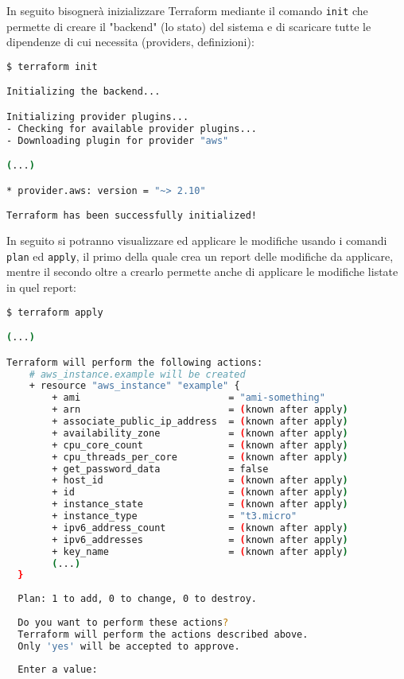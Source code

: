 \documentclass[../main.tex]{subfiles}
\begin{document}
    	        In seguito bisognerà inizializzare Terraform mediante il comando \verb|init| che permette di creare il "backend" (lo stato) del sistema e di scaricare tutte le dipendenze di cui necessita (providers, definizioni):
    	        \begin{lstlisting}[language=bash]
$ terraform init

Initializing the backend...

Initializing provider plugins...
- Checking for available provider plugins...
- Downloading plugin for provider "aws"

(...)

* provider.aws: version = "~> 2.10"

Terraform has been successfully initialized!
                \end{lstlisting}
                
                In seguito si potranno visualizzare ed applicare le modifiche usando i comandi \verb|plan| ed \verb|apply|, il primo della quale crea un report delle modifiche da applicare, mentre il secondo oltre a crearlo permette anche di applicare le modifiche listate in quel report:
    	        \begin{lstlisting}[language=bash]
$ terraform apply

(...)

Terraform will perform the following actions:  
    # aws_instance.example will be created
    + resource "aws_instance" "example" {
        + ami                          = "ami-something"
        + arn                          = (known after apply)
        + associate_public_ip_address  = (known after apply)
        + availability_zone            = (known after apply)
        + cpu_core_count               = (known after apply)
        + cpu_threads_per_core         = (known after apply)
        + get_password_data            = false
        + host_id                      = (known after apply)
        + id                           = (known after apply)
        + instance_state               = (known after apply)
        + instance_type                = "t3.micro"
        + ipv6_address_count           = (known after apply)
        + ipv6_addresses               = (known after apply)
        + key_name                     = (known after apply)
        (...)
  }
  
  Plan: 1 to add, 0 to change, 0 to destroy.
  
  Do you want to perform these actions?
  Terraform will perform the actions described above.
  Only 'yes' will be accepted to approve.
  
  Enter a value:
                \end{lstlisting}
    	
\end{document}
